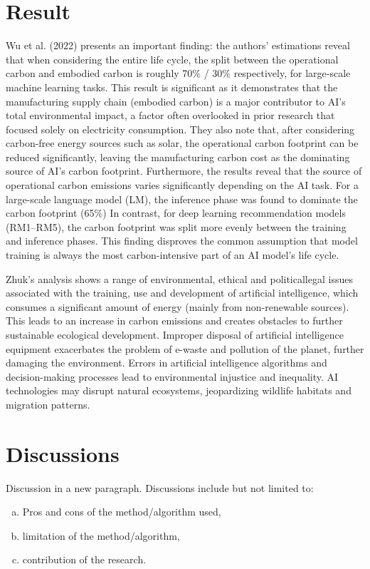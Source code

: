 \documentclass[a4paper, 12pt]{article}
\begin{document}
\section{Result}
\hspace{24pt}Wu et al. (2022) presents an important finding: the authors' estimations reveal that when considering the entire life cycle, the split between the operational carbon and embodied carbon is roughly 70\% / 30\% respectively, for large-scale machine learning tasks. This result is significant as it demonstrates that the manufacturing supply chain (embodied carbon) is a major contributor to AI's total environmental impact, a factor often overlooked in prior research that focused solely on electricity consumption. They also note that, after considering carbon-free energy sources such as solar, the operational carbon footprint can be reduced significantly, leaving the manufacturing carbon cost as the dominating source of AI's carbon footprint. Furthermore, the results reveal that the source of operational carbon emissions varies significantly depending on the AI task. For a large-scale language model (LM), the inference phase was found to dominate the carbon footprint (65\%) In contrast, for deep learning recommendation models (RM1–RM5), the carbon footprint was split more evenly between the training and inference phases. This finding disproves the common assumption that model training is always the most carbon-intensive part of an AI model's life cycle.

\hspace{24pt} Zhuk's analysis shows a range of environmental, ethical and politicallegal issues associated with the training, use and development of artificial intelligence, which consumes a significant amount of energy (mainly from non-renewable sources). This leads to an increase in carbon emissions and creates obstacles to further sustainable ecological development. Improper disposal of artificial intelligence equipment exacerbates the problem of e-waste and pollution of the planet, further damaging the environment. Errors in artificial intelligence algorithms and decision-making processes
lead to environmental injustice and inequality. AI technologies may disrupt
natural ecosystems, jeopardizing wildlife habitats and migration patterns.

\section{Discussions}
Discussion in a new paragraph.
Discussions include but not limited to:
\begin{enumerate}[(a)]
\item Pros and cons of the method/algorithm used,
\item limitation of the method/algorithm,
\item contribution of the research.
\end{enumerate}
\end{document}

